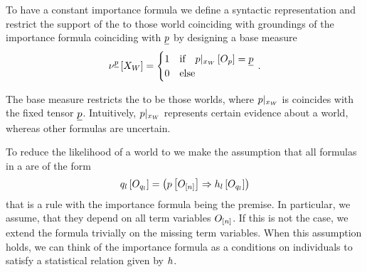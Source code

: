 To have a constant importance formula we define a syntactic representation and restrict the support of the \HybridFOLNetwork{} to those world coinciding with groundings of the importance formula coinciding with $\underline{p}$ by designing a base measure
\begin{align*}
    \nu^{\underline{p}}\left[X_{W}\right]
    = \begin{cases}
          1 & \text{if}\quad {p}|_{x_{W}} \left[O_{p}\right] = \underline{p} \\
          0 & \text{else}
    \end{cases} \, .
\end{align*}

The base measure restricts the \HybridFOLNetwork{} to be those worlds, where ${p}|_{x_{W}}$ is coincides with the fixed tensor $\underline{p}$.
Intuitively, ${p}|_{x_{W}}$ represents certain evidence about a \firstOrderLogic{} world, whereas other formulas are uncertain.






To reduce the likelihood of a world to we make the assumption that all formulas in a \HybridFOLNetwork{} are of the form
\begin{align}
    \label{eq:folImplicationForm}
    q_{l}\left[O_{q_{l}}\right]
    = \left( p\left[O_{[n]}\right] \Rightarrow h_{l}\left[O_{q_{l}}\right] \right)
\end{align}
that is a rule with the importance formula being the premise.
In particular, we assume, that they depend on all term variables $O_{[n]}$.
If this is not the case, we extend the formula trivially on the missing term variables.
When this assumption holds, we can think of the importance formula as a conditions on individuals to satisfy a statistical relation given by $h$.

